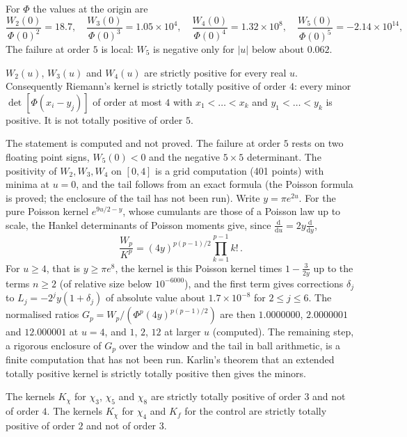 For $\Phi$ the values at the origin are
\[
\frac{W_2(0)}{\Phi(0)^2}=18.7,\quad\frac{W_3(0)}{\Phi(0)^3}=1.05\times10^{4},\quad\frac{W_4(0)}{\Phi(0)^4}=1.32\times10^{8},\quad\frac{W_5(0)}{\Phi(0)^5}=-2.14\times10^{14},
\]
The failure at order $5$ is local: $W_5$ is negative only for $|u|$ below about $0.062$.

\begin{proposition}[computed]\label{c:thm:tp4}
$W_2(u)$, $W_3(u)$ and $W_4(u)$ are strictly positive for every real $u$. Consequently Riemann's kernel is strictly totally positive of order $4$: every minor $\det[\Phi(x_i-y_j)]$ of order at most $4$ with $x_1<\dots<x_k$ and $y_1<\dots<y_k$ is positive. It is not totally positive of order $5$.
\end{proposition}

The statement is computed and not proved. The failure at order $5$ rests on two floating point signs, $W_5(0)<0$ and the negative $5\times5$ determinant. The positivity of $W_2,W_3,W_4$ on $[0,4]$ is a grid computation (401 points) with minima at $u=0$, and the tail follows from an exact formula (the Poisson formula is proved; the enclosure of the tail has not been run). Write $y=\pi e^{2u}$. For the pure Poisson kernel $e^{9u/2-y}$, whose cumulants are those of a Poisson law up to scale, the Hankel determinants of Poisson moments give, since $\frac{\mathrm d}{\mathrm du}=2y\frac{\mathrm d}{\mathrm dy}$,
\[
\frac{W_p}{K^p}=(4y)^{p(p-1)/2}\prod_{k=1}^{p-1}k!\,.
\]
For $u\ge4$, that is $y\ge\pi e^8$, the kernel is this Poisson kernel times $1-\frac3{2y}$ up to the terms $n\ge2$ (of relative size below $10^{-6000}$), and the first term gives corrections $\delta_j$ to $L_j=-2^jy(1+\delta_j)$ of absolute value about $1.7\times10^{-8}$ for $2\le j\le6$. The normalised ratios $G_p=W_p/(\Phi^p(4y)^{p(p-1)/2})$ are then $1.0000000$, $2.0000001$ and $12.000001$ at $u=4$, and $1$, $2$, $12$ at larger $u$ (computed). The remaining step, a rigorous enclosure of $G_p$ over the window and the tail in ball arithmetic, is a finite computation that has not been run. Karlin's theorem that an extended totally positive kernel is strictly totally positive then gives the minors.

\begin{proposition}[computed]\label{c:thm:lk}
The kernels $K_\chi$ for $\chi_3$, $\chi_5$ and $\chi_8$ are strictly totally positive of order $3$ and not of order $4$. The kernels $K_\chi$ for $\chi_4$ and $K_f$ for the control are strictly totally positive of order $2$ and not of order $3$.
\end{proposition}

